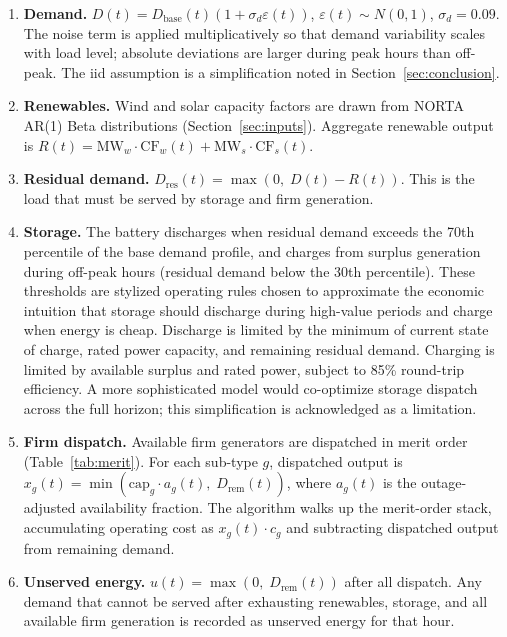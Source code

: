 \documentclass[11pt]{article}
\begin{document}
\begin{enumerate}[leftmargin=*, itemsep=2pt]
  \item \textbf{Demand.} $D(t) = D_{\text{base}}(t)(1 + \sigma_d \varepsilon(t))$, $\varepsilon(t) \sim N(0,1)$, $\sigma_d = 0.09$. The noise term is applied multiplicatively so that demand variability scales with load level; absolute deviations are larger during peak hours than off-peak. The iid assumption is a simplification noted in Section~\ref{sec:conclusion}.
  \item \textbf{Renewables.} Wind and solar capacity factors are drawn from NORTA AR(1) Beta distributions (Section~\ref{sec:inputs}). Aggregate renewable output is $R(t) = \text{MW}_w \cdot \text{CF}_w(t) + \text{MW}_s \cdot \text{CF}_s(t)$.
  \item \textbf{Residual demand.} $D_{\text{res}}(t) = \max(0,\; D(t) - R(t))$. This is the load that must be served by storage and firm generation.
  \item \textbf{Storage.} The battery discharges when residual demand exceeds the 70th percentile of the base demand profile, and charges from surplus generation during off-peak hours (residual demand below the 30th percentile). These thresholds are stylized operating rules chosen to approximate the economic intuition that storage should discharge during high-value periods and charge when energy is cheap. Discharge is limited by the minimum of current state of charge, rated power capacity, and remaining residual demand. Charging is limited by available surplus and rated power, subject to 85\% round-trip efficiency. A more sophisticated model would co-optimize storage dispatch across the full horizon; this simplification is acknowledged as a limitation.
  \item \textbf{Firm dispatch.} Available firm generators are dispatched in merit order (Table~\ref{tab:merit}). For each sub-type $g$, dispatched output is $x_g(t) = \min(\text{cap}_g \cdot a_g(t),\; D_{\text{rem}}(t))$, where $a_g(t)$ is the outage-adjusted availability fraction. The algorithm walks up the merit-order stack, accumulating operating cost as $x_g(t) \cdot c_g$ and subtracting dispatched output from remaining demand.
  \item \textbf{Unserved energy.} $u(t) = \max(0,\; D_{\text{rem}}(t))$ after all dispatch. Any demand that cannot be served after exhausting renewables, storage, and all available firm generation is recorded as unserved energy for that hour.
\end{enumerate}
\end{document}
